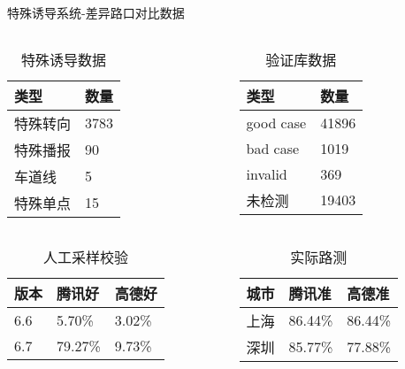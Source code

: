 \documentclass[10pt]{beamer}
\begin{document}
\begin{frame}{特殊诱导系统-差异路口对比数据}
	\begin{columns}[T,onlytextwidth]
		\begin{table}
			\caption{特殊诱导数据}
							\begin{tabularx}{\textwidth}{XX}
								\toprule
									类型 & 数量\\
									\midrule
									特殊转向 & 3783\\
									特殊播报 & 90\\
									车道线 & 5\\
									特殊单点 & 15\\
									\bottomrule
							\end{tabularx}
		\end{table}		
		\begin{table}
			\caption{验证库数据}
							\begin{tabularx}{\textwidth}{XX}
								\toprule
									类型 & 数量\\
									\midrule
									good case & 41896\\
									bad case & 1019\\
									invalid & 369\\
									未检测 & 19403\\
									\bottomrule
							\end{tabularx}
		\end{table}		
	\end{columns}
	\begin{columns}[T,onlytextwidth]
		\begin{table}
			\caption{人工采样校验}
					\begin{tabularx}{1\textwidth}{XXX}
						\toprule
						版本 & 腾讯好 & 高德好\\
						\midrule
						6.6 & 5.70\% & 3.02\%\\
						6.7 & 79.27\% & 9.73\%\\
						\bottomrule
					\end{tabularx}
		\end{table}
			\begin{table}
				\caption{实际路测}
					\begin{tabularx}{1\textwidth}{XXX}
						\toprule
						城市 & 腾讯准 & 高德准\\
						\midrule
						上海 & 86.44\% & 86.44\%\\
						深圳 & 85.77\% & 77.88\%\\
						\bottomrule
					\end{tabularx}
			\end{table}
	\end{columns}
\end{frame}
\end{document}
